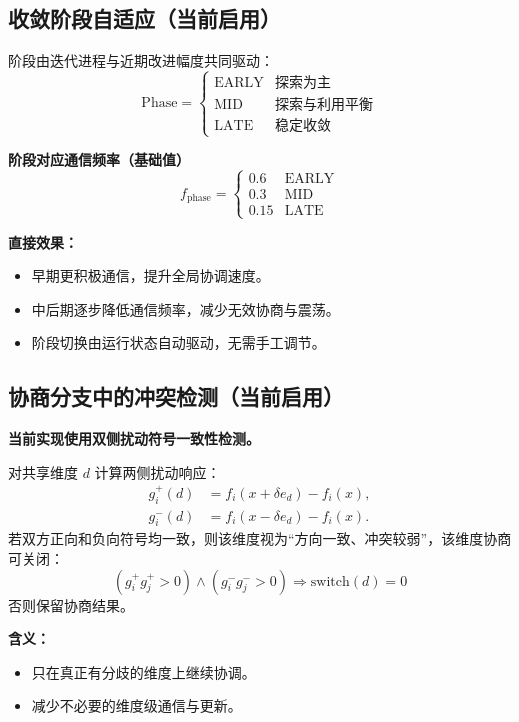 \documentclass[11pt,a3paper]{ctexart}
\begin{document}
\subsection{收敛阶段自适应（当前启用）}
阶段由迭代进程与近期改进幅度共同驱动：
\begin{equation}
\text{Phase} = \begin{cases}
\text{EARLY} & \text{探索为主} \\
\text{MID} & \text{探索与利用平衡} \\
\text{LATE} & \text{稳定收敛}
\end{cases}
\end{equation}

\textbf{阶段对应通信频率（基础值）}
\begin{equation}
f_{\text{phase}} = \begin{cases}
0.6 & \text{EARLY}\\
0.3 & \text{MID}\\
0.15 & \text{LATE}
\end{cases}
\end{equation}

\textbf{直接效果：}
\begin{itemize}
    \item 早期更积极通信，提升全局协调速度。
    \item 中后期逐步降低通信频率，减少无效协商与震荡。
    \item 阶段切换由运行状态自动驱动，无需手工调节。
\end{itemize}

\subsection{协商分支中的冲突检测（当前启用）}
\textbf{当前实现使用双侧扰动符号一致性检测。}

对共享维度 $d$ 计算两侧扰动响应：
\begin{align}
g_i^+(d) &= f_i(x+\delta e_d)-f_i(x), \\
g_i^-(d) &= f_i(x-\delta e_d)-f_i(x).
\end{align}
若双方正向和负向符号均一致，则该维度视为“方向一致、冲突较弱”，该维度协商可关闭：
\begin{equation}
(g_i^+g_j^+>0)\land(g_i^-g_j^->0)\Rightarrow \text{switch}(d)=0
\end{equation}
否则保留协商结果。

\textbf{含义：}
\begin{itemize}
    \item 只在真正有分歧的维度上继续协调。
    \item 减少不必要的维度级通信与更新。
\end{itemize}
\end{document}
